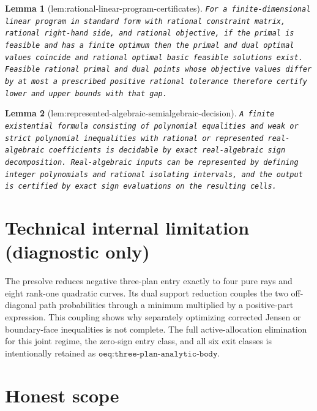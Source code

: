 \documentclass{article}
\newtheorem{lemma}{Lemma}
\begin{document}
\begin{lemma}[lem:rational-linear-program-certificates]\label{lem:rational-linear-program-certificates}
\texttt{For a finite-\allowbreak{}dimensional linear program in standard form with rational constraint matrix,\allowbreak{} rational right-\allowbreak{}hand side,\allowbreak{} and rational objective,\allowbreak{} if the primal is feasible and has a finite optimum then the primal and dual optimal values coincide and rational optimal basic feasible solutions exist.  Feasible rational primal and dual points whose objective values differ by at most a prescribed positive rational tolerance therefore certify lower and upper bounds with that gap.}
\end{lemma}

\begin{lemma}[lem:represented-algebraic-semialgebraic-decision]\label{lem:represented-algebraic-semialgebraic-decision}
\texttt{A finite existential formula consisting of polynomial equalities and weak or strict polynomial inequalities with rational or represented real-\allowbreak{}algebraic coefficients is decidable by exact real-\allowbreak{}algebraic sign decomposition.  Real-\allowbreak{}algebraic inputs can be represented by defining integer polynomials and rational isolating intervals,\allowbreak{} and the output is certified by exact sign evaluations on the resulting cells.}
\end{lemma}

\section*{Technical internal limitation (diagnostic only)}

The presolve reduces negative three-plan entry exactly to four pure rays and eight rank-one quadratic curves. Its dual support reduction couples the two off-diagonal path probabilities through a minimum multiplied by a positive-part expression. This coupling shows why separately optimizing corrected Jensen or boundary-face inequalities is not complete. The full active-allocation elimination for this joint regime, the zero-sign entry class, and all six exit classes is intentionally retained as \(\texttt{oeq:three-plan-analytic-body}\).

\section{Honest scope}
\end{document}
